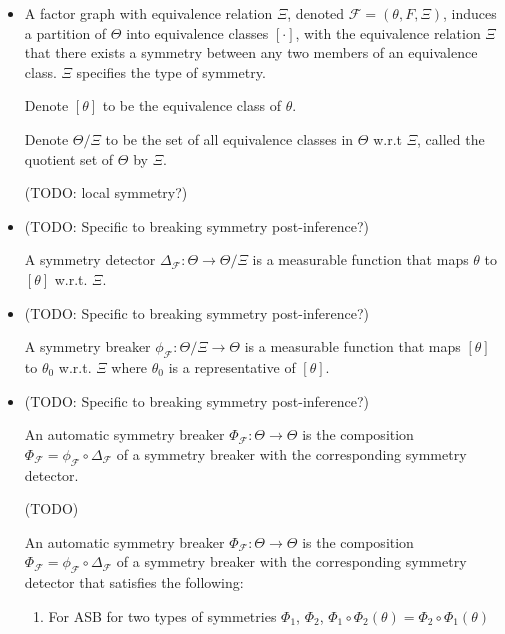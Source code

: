 \documentclass{article}
\begin{document}
\begin{itemize}

\item
A factor graph with equivalence relation $\Xi$, denoted $\mathcal{F}=(\theta,F,\Xi)$, induces a partition of $\Theta$ into equivalence classes $[\cdot]$, with the equivalence relation $\Xi$ that there exists a symmetry between any two members of an equivalence class. $\Xi$ specifies the type of symmetry.

Denote $[\theta]$ to be the equivalence class of $\theta$.

Denote $\Theta/\Xi$ to be the set of all equivalence classes in $\Theta$ w.r.t $\Xi$, called the quotient set of $\Theta$ by $\Xi$.

(TODO: local symmetry?)

\item
(TODO: Specific to breaking symmetry post-inference?)

A symmetry detector $\Delta_\mathcal{F}:\Theta\rightarrow\Theta/\Xi$ is a measurable function that maps $\theta$ to $[\theta]$ w.r.t. $\Xi$.

\item
(TODO: Specific to breaking symmetry post-inference?)

A symmetry breaker $\phi_\mathcal{F}:\Theta/\Xi\rightarrow\Theta$ is a measurable function that maps $[\theta]$ to $\theta_0$ w.r.t. $\Xi$ where $\theta_0$ is a representative of $[\theta]$.

\item
(TODO: Specific to breaking symmetry post-inference?)

An automatic symmetry breaker $\Phi_\mathcal{F}:\Theta\rightarrow\Theta$ is the composition $\Phi_\mathcal{F}=\phi_\mathcal{F}\circ\Delta_\mathcal{F}$ of a symmetry breaker with the corresponding symmetry detector.

(TODO)

An automatic symmetry breaker $\Phi_\mathcal{F}:\Theta\rightarrow\Theta$ is the composition $\Phi_\mathcal{F}=\phi_\mathcal{F}\circ\Delta_\mathcal{F}$ of a symmetry breaker with the corresponding symmetry detector that satisfies the following:
\begin{enumerate}

\item
For ASB for two types of symmetries $\Phi_1$, $\Phi_2$, $\Phi_1\circ\Phi_2(\theta)=\Phi_2\circ\Phi_1(\theta)$

\end{enumerate}


\end{itemize}
\end{document}
